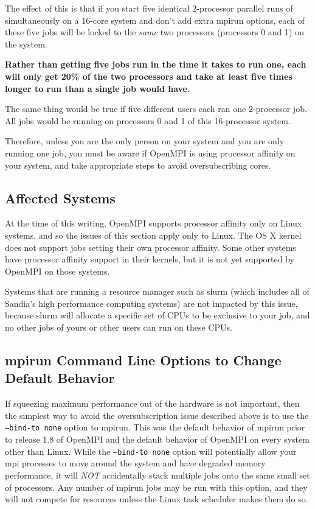The effect of this is that if you start five identical 2-processor
parallel runs of \Xyce{} simultaneously on a 16-core system and don't add
extra mpirun options, each of these five jobs will be locked to the
\emph{same\/} two processors (processors 0 and 1) on the system.

{\bf Rather than getting five jobs run in the time it takes to run one,
each will only get 20\% of the two processors and take at least five
times longer to run than a single job would have.}

The same thing
would be true if five different users each ran one 2-processor \Xyce{}
job.  All jobs would be running on processors 0 and 1 of this
16-processor system.

Therefore, unless you are the only person on your system and you are
only running one job, you must be aware if OpenMPI is using processor
affinity on your system, and take appropriate steps to avoid
oversubscribing cores.

\subsection{Affected Systems}

At the time of this writing, OpenMPI supports processor affinity only
on Linux systems, and so the issues of this section apply only to
Linux.  The OS X kernel does not support jobs setting their own
processor affinity.  Some other systems have processor affinity
support in their kernels, but it is not yet supported by OpenMPI on
those systems.

Systems that are running a resource manager such as slurm (which
includes all of Sandia's high performance computing systems) are not
impacted by this issue, because slurm will allocate a specific set of
CPUs to be exclusive to your job, and no other jobs of yours or other
users can run on these CPUs.

\subsection{mpirun Command Line Options to Change Default Behavior}

If squeezing maximum performance out of the hardware is not important,
then the simplest way to avoid the oversubscription issue described
above is to use the \texttt{--bind-to none} option to mpirun.  This
was the default behavior of mpirun prior to release 1.8 of OpenMPI and
the default behavior of OpenMPI on every system other than Linux.
While the \texttt{--bind-to none} option will potentially allow your 
mpi processes to move around the
system and have degraded memory performance, it will \emph{NOT\/}
accidentally stack multiple jobs onto the same small set of
processors.  Any number of mpirun jobs may be run with this option,
and they will not compete for resources unless the Linux task
scheduler makes them do so.

